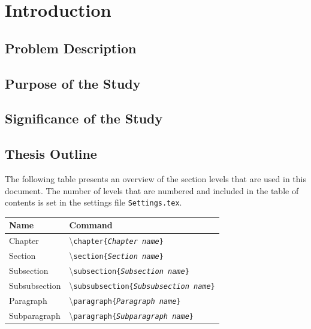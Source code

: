 \setlength{\parskip}{1em}
\chapter{Introduction}



\section{Problem Description}



\section{Purpose of the Study}



\section{Significance of the Study}



\section{Thesis Outline}


The following table presents an overview of the section levels that are used in this document. The number of levels that are numbered and included in the table of contents is set in the settings file \texttt{Settings.tex}. 

\begin{table}[H]
\centering
\begin{tabular}{ll} \hline\hline
Name & Command\\ \hline
Chapter & \textbackslash\texttt{chapter\{\emph{Chapter name}\}}\\
Section & \textbackslash\texttt{section\{\emph{Section name}\}}\\
Subsection & \textbackslash\texttt{subsection\{\emph{Subsection name}\}}\\
Subsubsection & \textbackslash\texttt{subsubsection\{\emph{Subsubsection name}\}}\\
Paragraph & \textbackslash\texttt{paragraph\{\emph{Paragraph name}\}}\\
Subparagraph & \textbackslash\texttt{paragraph\{\emph{Subparagraph name}\}}\\ \hline\hline
\end{tabular}
\end{table}

